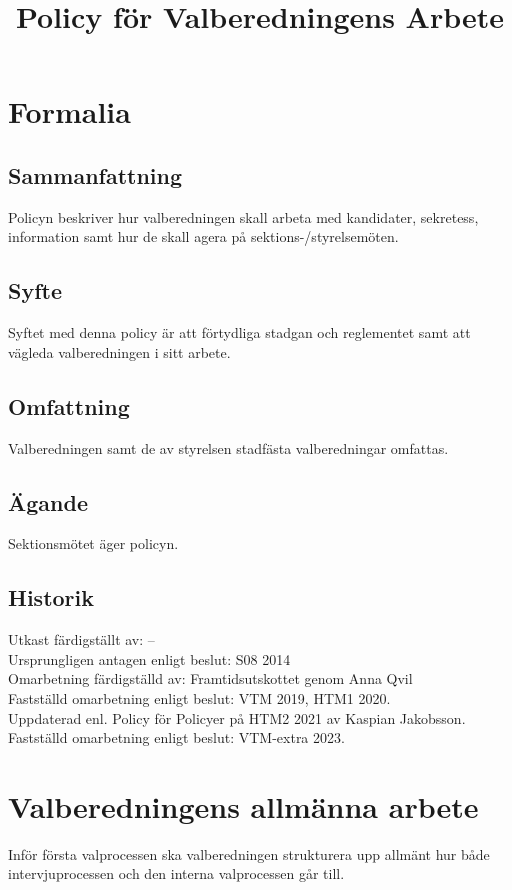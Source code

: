 \documentclass{dsekprotokoll}
\title{Policy för Valberedningens Arbete}
\author{}
\begin{document}
\maketitle

\section{Formalia}
\subsection{Sammanfattning}
Policyn beskriver hur valberedningen skall arbeta med kandidater, sekretess, information samt
hur de skall agera på sektions-/styrelsemöten.

\subsection{Syfte}
Syftet med denna policy är att förtydliga stadgan och reglementet samt att vägleda valberedningen i sitt arbete.

\subsection{Omfattning}
Valberedningen samt de av styrelsen stadfästa valberedningar omfattas.

\subsection{Ägande}
Sektionsmötet äger policyn.
\subsection{Historik}
Utkast färdigställt av: – \\
Ursprungligen antagen enligt beslut: S08 2014\\
Omarbetning färdigställd av: Framtidsutskottet genom Anna Qvil\\
Fastställd omarbetning enligt beslut: VTM 2019, HTM1 2020. \\
Uppdaterad enl. Policy för Policyer på HTM2 2021 av Kaspian Jakobsson.\\
Fastställd omarbetning enligt beslut: VTM-extra 2023.


\section{Valberedningens allmänna arbete}

Inför första valprocessen ska valberedningen strukturera upp allmänt hur både intervjuprocessen och den
interna valprocessen går till.
\end{document}
